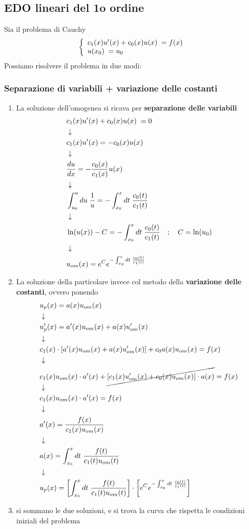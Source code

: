 \subsection{EDO lineari del 1o ordine}

Sia il problema di Cauchy
\begin{align}
	\left\{\begin{array}{c}
		c_1 (x) u'(x) + c_0(x) u(x) \; = f(x) \hfill \\
		u(x_0) \;  = u_0 \hfill 
	\end{array}
	\right. \label{ode1ord1}
\end{align}
Possiamo risolvere il problema in due modi:

\subsubsection{Separazione di variabili + variazione delle costanti}
	\begin{enumerate}
		\item La soluzione dell'omogenea si ricava per \textbf{separazione delle variabili}
		\begin{align}
			&c_1 (x) u'(x) + c_0(x) u(x) \; = 0 \\ &\downarrow \nonumber \\
			&c_1 (x) u'(x) = - c_0(x) u(x) \nonumber \\ &\downarrow \nonumber \\
			&\frac{du}{dx} = -\frac{c_0(x)}{c_1(x)} u(x)\nonumber \\ &\downarrow \nonumber \\
			&\int_{u_0}^u du \; \frac{1}{u}= - \int_{x_0}^x dt \;  \frac{c_0(t)}{c_1(t)}\nonumber \\ &\downarrow \nonumber \\
			&\ln(u(x)) - C = - \int_{x_0}^x dt \;  \frac{c_0(t)}{c_1(t)} \quad ; \quad C = \ln (u_0)\nonumber \\ &\downarrow \nonumber \\
			&u_{om}(x) = e^C e^{- \int_{x_0}^x dt \;  \frac{c_0(t)}{c_1(t)}}
		\end{align}
		\item La soluzione della particolare invece col metodo della \textbf{variazione delle costanti}, ovvero ponendo
		\begin{align}
			&u_p(x) = a(x) u_{om}(x)\\ &\downarrow \nonumber \\
			&u'_p(x)= a'(x) u_{om}(x) +  a(x) u'_{om}(x) \nonumber \\ &\downarrow \nonumber \\
			&c_1(x) \cdot [a'(x) u_{om}(x) +  a(x) u'_{om}(x)] + c_0 a(x) u_{om}(x) =f(x) \nonumber \\ &\downarrow \nonumber \\
			&c_1(x)u_{om}(x) \cdot a'(x) + \cancel{[c_1(x)u'_{om}(x) + c_0(x)u_{om}(x)]\cdot a(x)} = f(x)\nonumber \\ &\downarrow \nonumber \\
			&c_1(x)u_{om}(x) \cdot a'(x) = f(x) \nonumber \\ &\downarrow \nonumber \\
			&a'(x) =\frac{f(x)}{c_1(x)u_{om}(x)} \nonumber \\ &\downarrow \nonumber \\
			&a(x) = \int_{x_0}^{x} dt\; \frac{f(t)}{c_1(t)u_{om}(t)} \nonumber \\ &\downarrow \nonumber \\
			&u_p(x) = \left[ \int_{x_0}^{x} dt\; \frac{f(t)}{c_1(t)u_{om}(t)} \right] \cdot \left[ e^C e^{- \int_{x_0}^x dt \;  \frac{c_0(t)}{c_1(t)}} \right]
		\end{align}
		\item si sommano le due soluzioni, e si trova la curva che rispetta le condizioni iniziali del problema
	\end{enumerate}
	
